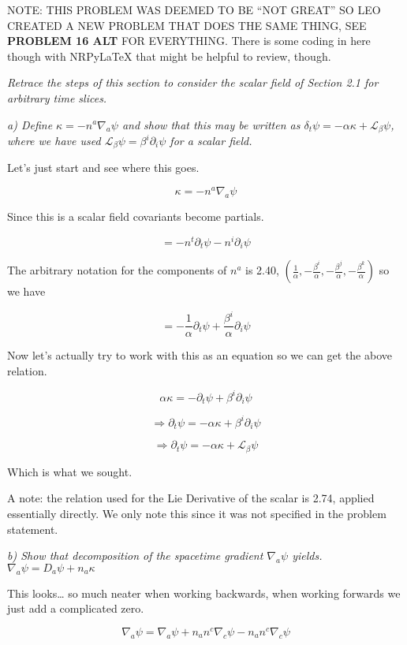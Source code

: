 \documentclass[landscape,letterpaper,10pt,english]{article}
\begin{document}
\[\label{P16}\]

NOTE: THIS PROBLEM WAS DEEMED TO BE ``NOT GREAT'' SO LEO CREATED A NEW
PROBLEM THAT DOES THE SAME THING, SEE \textbf{PROBLEM 16 ALT} FOR
EVERYTHING. There is some coding in here though with NRPyLaTeX that
might be helpful to review, though.

\emph{Retrace the steps of this section to consider the scalar field of
Section 2.1 for arbitrary time slices.}

\emph{a) Define \(\kappa = -n^a \nabla_a \psi\) and show that this may
be written as
\(\delta_t \psi = -\alpha \kappa + \mathcal{L}_\beta \psi\), where we
have used \(\mathcal{L}_\beta \psi = \beta^i \partial_i \psi\) for a
scalar field.}

    Let's just start and see where this goes.

\[\kappa = -n^a \nabla_a \psi\]

Since this is a scalar field covariants become partials.

\[ = -n^t \partial_t \psi - n^i \partial_i \psi  \]

The arbitrary notation for the components of \(n^a\) is 2.40,
\((\frac1\alpha,-\frac{\beta^i}{\alpha},-\frac{\beta^j}{\alpha},-\frac{\beta^k}{\alpha})\)
so we have

\[ = -\frac{1}{\alpha} \partial_t \psi + \frac{\beta^i}{\alpha} \partial_i \psi  \]

Now let's actually try to work with this as an equation so we can get
the above relation.

\[ \alpha\kappa = -\partial_t \psi + \beta^i \partial_i \psi \]

\[ \Rightarrow \partial_t \psi = -\alpha \kappa + \beta^i \partial_i \psi \]

\[ \Rightarrow \partial_t \psi = -\alpha \kappa + \mathcal{L}_\beta \psi \]

Which is what we sought.

    A note: the relation used for the Lie Derivative of the scalar is 2.74,
applied essentially directly. We only note this since it was not
specified in the problem statement.

    \emph{b) Show that decomposition of the spacetime gradient
\(\nabla_a \psi\) yields. \(\nabla_a \psi = D_a \psi + n_a \kappa\)}

    This looks\ldots{} so much neater when working backwards, when working
forwards we just add a complicated zero.

\[\nabla_a \psi = \nabla_a \psi + n_a n^c \nabla_c \psi - n_a n^c \nabla_c \psi\]
\end{document}
